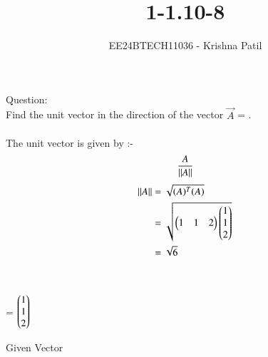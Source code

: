 \documentclass[journal]{IEEEtran}
\begin{document}

\vspace{3cm}

\title{1-1.10-8}
\author{EE24BTECH11036 - Krishna Patil}
{\let\newpage\relax\maketitle}
Question:\\
Find the unit vector in the direction of the vector  $\vec{A}$ = . 
\\ \\
\solution
The unit vector is given by :-
\begin{align}
	\frac{A}{\left\lVert A\right\rVert}
\end{align}
\begin{align}
	\left\lVert A\right\rVert &= \sqrt{(A)^T(A)}\\
	&= \sqrt{\begin{pmatrix}1 & 1 & 2\end{pmatrix}\begin{pmatrix}1\\1\\2\end{pmatrix}}\\
	&= \sqrt{6} 
\end{align}
\\ \\
\centering
\therefore {} =  $\begin{pmatrix}1\\1\\2\end{pmatrix}$ \\
\begin{table}[h!]    
  \centering
  
  \caption{Given Vector}
  \label{tab1-1.9-6}
\end{table}
\end{document}
